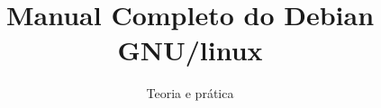 \documentclass{novel}
\title     {Manual Completo do Debian GNU/linux}
\subtitle  {Teoria e prática}
\begin{document}
\toc





\end{document}
